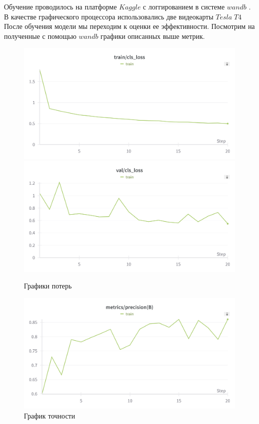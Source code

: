 Обучение проводилось на платформе $Kaggle$ \cite{kaggle} с логгированием в системе $wandb$ \cite{wandb}. В качестве графического процессора использовались две видеокарты $Tesla\;T4$
После обучения модели мы переходим к оценки ее эффективности. Посмотрим на полученные с помощью $wandb$ графики описанных выше метрик.
\begin{figure}
    \includegraphics[scale=0.15]{img/train/train_cls_loss.png}
    \includegraphics[scale=0.15]{img/train/val_cls_loss.png}
    \caption{Графики потерь}
    \label{cls_loss_graph}
\end{figure}

\begin{figure}
    \includegraphics[scale=0.15]{img/train/precision.png}
    \caption{График точности}
    \label{precision_graph}
\end{figure}

